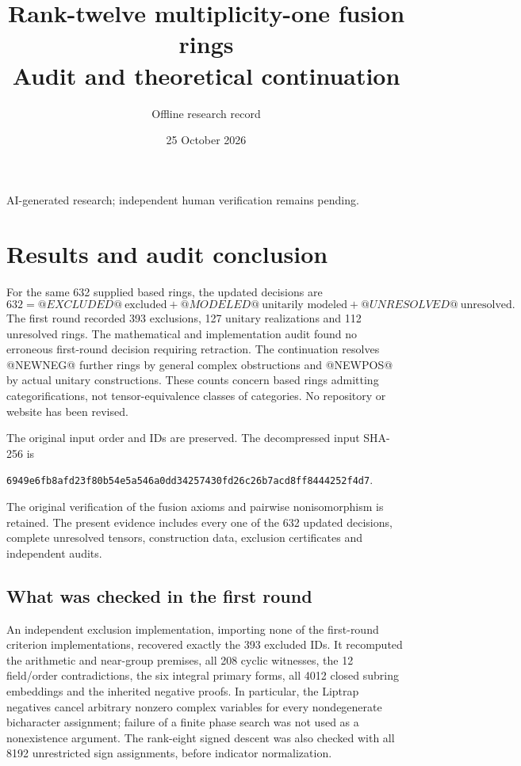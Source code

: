 \documentclass[11pt]{article}
\title{Rank-twelve multiplicity-one fusion rings\\\large Audit and theoretical continuation}
\author{Offline research record}\date{25 October 2026}
\begin{document}
\maketitle
\begin{center}\small AI-generated research; independent human verification remains pending.\end{center}

\section{Results and audit conclusion}
For the same 632 supplied based rings, the updated decisions are
\[
 \boxed{632=@EXCLUDED@\ \text{excluded}+@MODELED@\ \text{unitarily modeled}+@UNRESOLVED@\ \text{unresolved}.}
\]
The first round recorded 393 exclusions, 127 unitary realizations and 112 unresolved
rings. The mathematical and implementation audit found no erroneous first-round
decision requiring retraction. The continuation resolves @NEWNEG@ further rings
by general complex obstructions and @NEWPOS@ by actual unitary constructions.
These counts concern based rings admitting categorifications, not tensor-equivalence
classes of categories. No repository or website has been revised.

The original input order and IDs are preserved. The decompressed input SHA-256 is
\begin{center}\scriptsize\texttt{6949e6fb8afd23f80b54e5a546a0dd34257430fd26c26b7acd8ff8444252f4d7}.\end{center}
The original verification of the fusion axioms and pairwise nonisomorphism is retained.
The present evidence includes every one of the 632 updated decisions, complete
unresolved tensors, construction data, exclusion certificates and independent audits.

\subsection*{What was checked in the first round}
An independent exclusion implementation, importing none of the first-round criterion
implementations, recovered exactly the 393 excluded IDs. It recomputed the arithmetic
and near-group premises, all 208 cyclic witnesses, the 12 field/order contradictions,
the six integral primary forms, all 4012 closed subring embeddings and the inherited
negative proofs. In particular, the Liptrap negatives cancel arbitrary nonzero complex
variables for every nondegenerate bicharacter assignment; failure of a finite phase
search was not used as a nonexistence argument. The rank-eight signed descent was
also checked with all 8192 unrestricted sign assignments, before indicator normalization.
\end{document}
